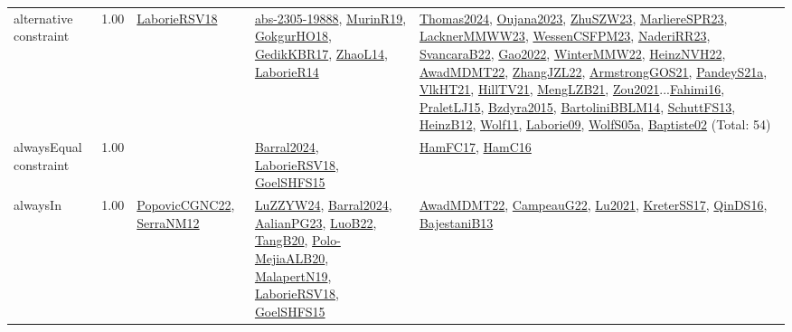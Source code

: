 {\begin{longtable}{p{3cm}r>{\raggedright\arraybackslash}p{6cm}>{\raggedright\arraybackslash}p{6cm}>{\raggedright\arraybackslash}p{8cm}}
\index{alternative constraint}\index{Constraints!alternative constraint}alternative constraint &  1.00 & \hyperref[detail:LaborieRSV18]{LaborieRSV18} & \hyperref[detail:abs-2305-19888]{abs-2305-19888}, \hyperref[detail:MurinR19]{MurinR19}, \hyperref[detail:GokgurHO18]{GokgurHO18}, \hyperref[detail:GedikKBR17]{GedikKBR17}, \hyperref[detail:ZhaoL14]{ZhaoL14}, \hyperref[detail:LaborieR14]{LaborieR14} & \hyperref[detail:Thomas2024]{Thomas2024}, \hyperref[detail:Oujana2023]{Oujana2023}, \hyperref[detail:ZhuSZW23]{ZhuSZW23}, \hyperref[detail:MarliereSPR23]{MarliereSPR23}, \hyperref[detail:LacknerMMWW23]{LacknerMMWW23}, \hyperref[detail:WessenCSFPM23]{WessenCSFPM23}, \hyperref[detail:NaderiRR23]{NaderiRR23}, \hyperref[detail:SvancaraB22]{SvancaraB22}, \hyperref[detail:Gao2022]{Gao2022}, \hyperref[detail:WinterMMW22]{WinterMMW22}, \hyperref[detail:HeinzNVH22]{HeinzNVH22}, \hyperref[detail:AwadMDMT22]{AwadMDMT22}, \hyperref[detail:ZhangJZL22]{ZhangJZL22}, \hyperref[detail:ArmstrongGOS21]{ArmstrongGOS21}, \hyperref[detail:PandeyS21a]{PandeyS21a}, \hyperref[detail:VlkHT21]{VlkHT21}, \hyperref[detail:HillTV21]{HillTV21}, \hyperref[detail:MengLZB21]{MengLZB21}, \hyperref[detail:Zou2021]{Zou2021}...\hyperref[detail:Fahimi16]{Fahimi16}, \hyperref[detail:PraletLJ15]{PraletLJ15}, \hyperref[detail:Bzdyra2015]{Bzdyra2015}, \hyperref[detail:BartoliniBBLM14]{BartoliniBBLM14}, \hyperref[detail:SchuttFS13]{SchuttFS13}, \hyperref[detail:HeinzB12]{HeinzB12}, \hyperref[detail:Wolf11]{Wolf11}, \hyperref[detail:Laborie09]{Laborie09}, \hyperref[detail:WolfS05a]{WolfS05a}, \hyperref[detail:Baptiste02]{Baptiste02} (Total: 54)\\
\index{alwaysEqual constraint}\index{Constraints!alwaysEqual constraint}alwaysEqual constraint &  1.00 &  & \hyperref[detail:Barral2024]{Barral2024}, \hyperref[detail:LaborieRSV18]{LaborieRSV18}, \hyperref[detail:GoelSHFS15]{GoelSHFS15} & \hyperref[detail:HamFC17]{HamFC17}, \hyperref[detail:HamC16]{HamC16}\\
\index{alwaysIn}\index{Constraints!alwaysIn}alwaysIn &  1.00 & \hyperref[detail:PopovicCGNC22]{PopovicCGNC22}, \hyperref[detail:SerraNM12]{SerraNM12} & \hyperref[detail:LuZZYW24]{LuZZYW24}, \hyperref[detail:Barral2024]{Barral2024}, \hyperref[detail:AalianPG23]{AalianPG23}, \hyperref[detail:LuoB22]{LuoB22}, \hyperref[detail:TangB20]{TangB20}, \hyperref[detail:Polo-MejiaALB20]{Polo-MejiaALB20}, \hyperref[detail:MalapertN19]{MalapertN19}, \hyperref[detail:LaborieRSV18]{LaborieRSV18}, \hyperref[detail:GoelSHFS15]{GoelSHFS15} & \hyperref[detail:AwadMDMT22]{AwadMDMT22}, \hyperref[detail:CampeauG22]{CampeauG22}, \hyperref[detail:Lu2021]{Lu2021}, \hyperref[detail:KreterSS17]{KreterSS17}, \hyperref[detail:QinDS16]{QinDS16}, \hyperref[detail:BajestaniB13]{BajestaniB13}\\

\end{longtable}}
